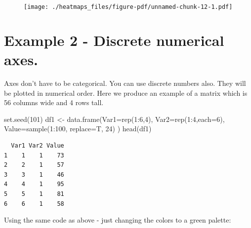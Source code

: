 \documentclass[
  letterpaper,
  DIV=11,
  numbers=noendperiod]{scrreprt}
\newenvironment{Shaded}{\begin{snugshade}}{\end{snugshade}}
\newcommand{\AttributeTok}[1]{\textcolor[rgb]{0.40,0.45,0.13}{#1}}
\newcommand{\DecValTok}[1]{\textcolor[rgb]{0.68,0.00,0.00}{#1}}
\newcommand{\FunctionTok}[1]{\textcolor[rgb]{0.28,0.35,0.67}{#1}}
\newcommand{\NormalTok}[1]{\textcolor[rgb]{0.00,0.23,0.31}{#1}}
\newcommand{\OtherTok}[1]{\textcolor[rgb]{0.00,0.23,0.31}{#1}}
\newcommand{\SpecialCharTok}[1]{\textcolor[rgb]{0.37,0.37,0.37}{#1}}
\begin{document}
\begin{figure}[H]

{\centering \texttt{[image: ./heatmaps\_files/figure-pdf/unnamed-chunk-12-1.pdf]}

}

\end{figure}

\hypertarget{example-2---discrete-numerical-axes.}{%
\section{\texorpdfstring{\textbf{Example 2 - Discrete numerical
axes.}}{Example 2 - Discrete numerical axes.}}\label{example-2---discrete-numerical-axes.}}

Axes don't have to be categorical. You can use discrete numbers also.
They will be plotted in numerical order. Here we produce an example of a
matrix which is 56 columns wide and 4 rows tall.

\begin{Shaded}
\begin{Highlighting}[]
\FunctionTok{set.seed}\NormalTok{(}\DecValTok{101}\NormalTok{)}
\NormalTok{df1 }\OtherTok{\textless{}{-}} \FunctionTok{data.frame}\NormalTok{(}\AttributeTok{Var1=}\FunctionTok{rep}\NormalTok{(}\DecValTok{1}\SpecialCharTok{:}\DecValTok{6}\NormalTok{,}\DecValTok{4}\NormalTok{),}
                 \AttributeTok{Var2=}\FunctionTok{rep}\NormalTok{(}\DecValTok{1}\SpecialCharTok{:}\DecValTok{4}\NormalTok{,}\AttributeTok{each=}\DecValTok{6}\NormalTok{),}
                 \AttributeTok{Value=}\FunctionTok{sample}\NormalTok{(}\DecValTok{1}\SpecialCharTok{:}\DecValTok{100}\NormalTok{, }\AttributeTok{replace=}\NormalTok{T, }\DecValTok{24}\NormalTok{)}
\NormalTok{)}
\FunctionTok{head}\NormalTok{(df1)}
\end{Highlighting}
\end{Shaded}

\begin{verbatim}
  Var1 Var2 Value
1    1    1    73
2    2    1    57
3    3    1    46
4    4    1    95
5    5    1    81
6    6    1    58
\end{verbatim}

Using the same code as above - just changing the colors to a green
palette:
\end{document}
